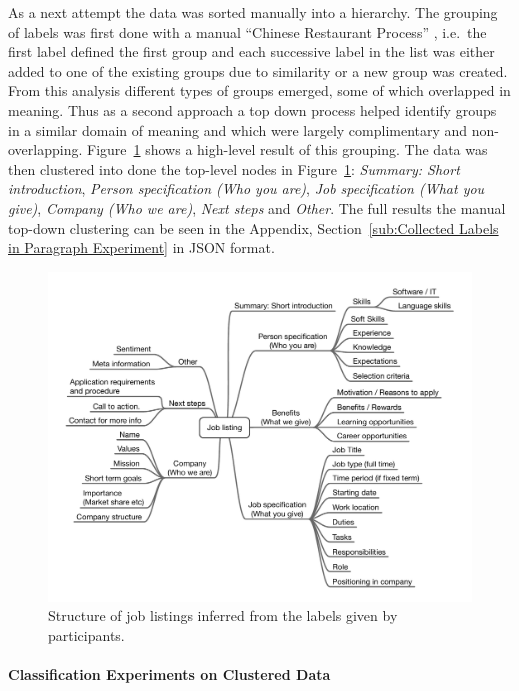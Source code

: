 As a next attempt the data was sorted manually into a hierarchy. The grouping of labels was first done with a manual ``Chinese Restaurant Process'' , i.e.\ the first label defined the first group and each successive label in the list was either added to one of the existing groups due to similarity or a new group was created.
From this analysis different types of groups emerged, some of which overlapped in meaning. Thus as a second approach a top down process helped identify groups in a similar domain of meaning and which were largely complimentary and non-overlapping.
Figure~\ref{fig:job-listing-structure} shows a high-level result of this grouping. The data was then clustered into done the top-level nodes in Figure~\ref{fig:job-listing-structure}: \emph{Summary: Short introduction}, \emph{Person specification (Who you are)}, \emph{Job specification (What you give)}, \emph{Company (Who we are)}, \emph{Next steps} and \emph{Other}. The full results the manual top-down clustering can be seen in the Appendix, Section~\ref{sub:Collected Labels in Paragraph Experiment} in \acrshort{JSON} format.

\begin{figure}[h]
  \centering
  \includegraphics[width=\textwidth]{img/job-listing-structure.pdf}
  \caption{Structure of job listings inferred from the labels given by participants.}
\label{fig:job-listing-structure}
\end{figure}

\paragraph{Classification Experiments on Clustered Data}
\label{par:Classification Experiments on Clustered Data (Multi-label Paragraph Classification)}

